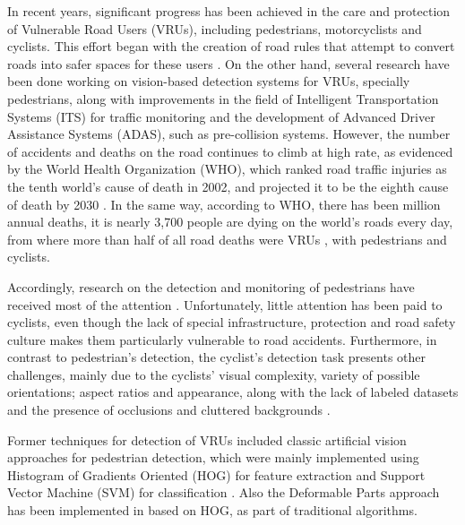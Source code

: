 \documentclass[journal]{IEEEtran}
\begin{document}
In recent years, significant progress has been achieved in the care and protection of Vulnerable Road Users (VRUs), including pedestrians, motorcyclists and cyclists. This effort began with the creation of road rules that attempt to convert roads into safer spaces for these users \cite{WorldHealthOrganization2018}. On the other hand, several research have been done working on vision-based detection systems for VRUs, specially pedestrians, along with improvements in the field of Intelligent Transportation Systems (ITS) for traffic monitoring and the development of Advanced Driver Assistance Systems (ADAS), such as pre-collision systems. 
However, the number of accidents and deaths on the road continues to climb at high rate, as evidenced by the World Health Organization (WHO), which ranked road traffic injuries as the tenth world's cause of death in 2002, and projected it to be the eighth cause of death by 2030 \cite{WHOProjections}. In the same way, according to WHO, there has been  million annual deaths, it is nearly 3,700 people are dying on the world's roads every day, from where more than half of all road deaths were VRUs \cite{WorldHealthOrganization2018}, with  pedestrians and  cyclists. 

Accordingly, research on the detection and monitoring of pedestrians have received most of the attention \cite{HOGhuman2005,PedestrianDetec2012,HOGhuma2013,ObjectDetect2009,PedestrianDetect2013,ObjectDetec2014,lan2018pedestrian,chen2019thermal,heo2019estimation}. Unfortunately, little attention has been paid to cyclists, even though the lack of special infrastructure, protection and road safety culture makes them particularly vulnerable to road accidents. Furthermore, in contrast to pedestrian's detection, the cyclist's detection task presents other challenges, mainly due to the cyclists' visual complexity, variety of possible orientations; aspect ratios and appearance, along with the lack of labeled datasets \cite{kang2019test} and the presence of occlusions and cluttered backgrounds \cite{UnifiedCyclist2017,BenchmarkCylistDetect2016}.

Former techniques for detection of VRUs included classic artificial vision approaches for pedestrian detection, which were mainly implemented using Histogram of Gradients Oriented (HOG) for feature extraction and Support Vector Machine (SVM) for classification \cite{HOGhuman2005,PedestrianDetec2012,HOGhuma2013}. Also the Deformable Parts approach has been implemented in \cite{ObjectDetect2009} based on HOG, as part of traditional algorithms. 
\end{document}
